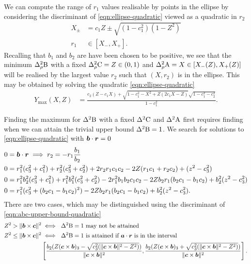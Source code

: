 We can compute the range of $r_1$ values realisable by points in the ellipse by considering the discriminant of \eqref{eqn:ellipse-quadratic} viewed as a quadratic in $r_2$
\begin{align}
  X_\pm &= c_1 Z \pm \sqrt{(1-c_1^2)(1-Z^2)}\\
  r_1 &\in [X_- , X_+].
\end{align}
Recalling that $b_1$ and $b_2$ are have been chosen to be positive, we see that the minimum $\varr{\opb}$ with a fixed $\varr{\opc} = Z\in (0,1)$ and $\varr{\opa} = X\in [X_-(Z), X_+(Z)]$ will be realised by the largest value $r_2$ such that $(X, r_2)$ is in the ellipse. This may be obtained by solving the quadratic \eqref{eqn:ellipse-quadratic}
\begin{align}
Y_\text{max}(X,Z) &= \frac{c_2( Z - c_1 X) + \sqrt{1-c_1^2 - X^2 + Z(2c_1 X - Z)}\sqrt{1-c_1^2 - c_2^2}}{1-c_1^2}.
\end{align}

Finding the maximum for $\var{\opb}$ with a fixed $\var{\opc}$ and $\var{\opa}$ first requires finding when we can attain the trivial upper bound $\var{\opb} = 1$. We search for solutions to \eqref{eqn:ellipse-quadratic} with $\bm{b}\cdot\bm{r} = 0$
\begin{align}
  0 &= \bm{b}\cdot\bm{r} \implies r_2 = -r_1 \frac{b_1}{b_2}\\
  0 &= r_1^2(c_3^2 + c_1^2) + r_2^2(c_3^2 + c_2^2) + 2 r_2 r_1 c_1 c_2 - 2 Z (r_1 c_1 + r_2 c_2) + (z^2 - c_3^2)\\
  0 &= r_1^2b_2^2(c_3^2 + c_1^2) + r_1^2 b_1^2(c_3^2 + c_2^2) - 2 r_1^2 b_1 b_2  c_1 c_2 - 2 Z b_2 r_1 ( b_2 c_1 - b_1 c_2) + b_2^2(z^2 - c_3^2)\\
  0 &= r_1^2 (c_3^2 + (b_2 c_1 - b_1 c_2)^2 ) - 2 Z b_2 r_1 ( b_2 c_1 - b_1 c_2) + b_2^2(z^2 - c_3^2).
      \label{eqn:abc-upper-bound-quadratic}
\end{align}
There are two cases, which may be distinguished using the discriminant of \eqref{eqn:abc-upper-bound-quadratic}
\begin{align}
  Z^2 > \|\bob\times\boc\|^2 &\iff \text{ $\var{\opb} = 1$ may not be attained}\\
  Z^2 \leq \|\bob\times\boc\|^2 &\iff \text{ $\var{\opb} = 1$ is attained if $\boa\cdot\bor$ is in the interval } \\ & \left[\frac{b_2(Z(\boc\times\bob)_3 - \sqrt{c_3^2 (\|\boc\times\bob\|^2 - Z^2)})}{\|\boc\times\bob\|^2},\frac{b_2(Z(\boc\times\bob)_3 + \sqrt{c_3^2 (\|\boc\times\bob\|^2 - Z^2)})}{\|\boc\times\bob\|^2}\right].
\end{align}


